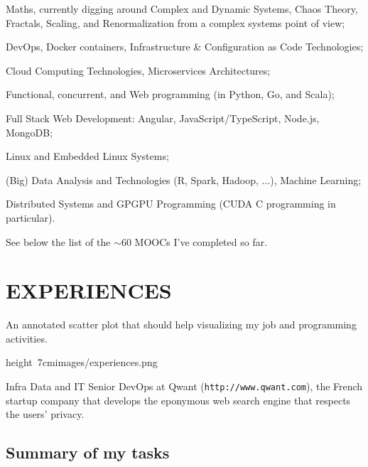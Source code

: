 \bgroup
\item{\bdot}
    Maths, currently digging around Complex and Dynamic Systems, Chaos Theory,
    Fractals, Scaling, and Renormalization from a complex systems point of view;
\item{\bdot}
    DevOps, Docker containers, Infrastructure \& Configuration as Code Technologies;
\item{\bdot}
    Cloud Computing Technologies, Microservices Architectures;
\item{\bdot}
    Functional, concurrent, and Web programming (in Python, Go, and Scala);
\item{\bdot}
    Full Stack Web Development: Angular, JavaScript/TypeScript, Node.js, MongoDB;
\item{\bdot}
    Linux and Embedded Linux Systems;
\item{\bdot}
    (Big) Data Analysis and Technologies (R, Spark, Hadoop, ...), Machine Learning;
\item{\bdot}
    Distributed Systems and GPGPU Programming
    (CUDA C\plusplus{} programming in particular).
\egroup

\smallskip\nobreak\noindent
See below the list of the $\sim$60 MOOCs I've completed so far.
\vfill\eject


\section{EXPERIENCES}

An annotated scatter plot that should help visualizing my job and programming activities.

\bigskip
\centerline{%
    \hbox{\pdfximage height 7cm{images/experiences.png}\pdfrefximage\pdflastximage}}
\smallskip



Infra Data and IT Senior DevOps at Qwant ({\tt http://www.qwant.com}), the
French startup company that develops the eponymous web search engine that respects
the users' privacy.

\subsection{Summary of my tasks}

